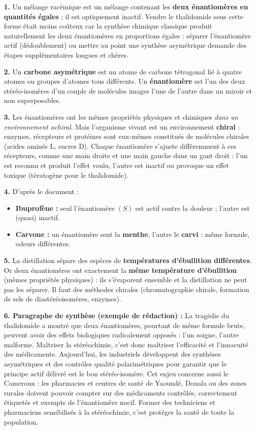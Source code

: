 \documentclass[11pt]{article}
\begin{document}
\begin{corrige}
\textbf{1.} Un mélange racémique est un mélange contenant les \textbf{deux énantiomères en quantités égales} ; il est optiquement inactif. Vendre le thalidomide sous cette forme était moins coûteux car la synthèse chimique classique produit naturellement les deux énantiomères en proportions égales : séparer l'énantiomère actif (dédoublement) ou mettre au point une synthèse asymétrique demande des étapes supplémentaires longues et chères.

\textbf{2.} Un \textbf{carbone asymétrique} est un atome de carbone tétragonal lié à quatre atomes ou groupes d'atomes tous différents. Un \textbf{énantiomère} est l'un des deux stéréo-isomères d'un couple de molécules images l'une de l'autre dans un miroir et non superposables.

\textbf{3.} Les énantiomères ont les mêmes propriétés physiques et chimiques \emph{dans un environnement achiral}. Mais l'organisme vivant est un environnement \textbf{chiral} : enzymes, récepteurs et protéines sont eux-mêmes constitués de molécules chirales (acides aminés L, sucres D). Chaque énantiomère s'ajuste différemment à ces récepteurs, comme une main droite et une main gauche dans un gant droit : l'un est reconnu et produit l'effet voulu, l'autre est inactif ou provoque un effet toxique (tératogène pour le thalidomide).

\textbf{4.} D'après le document :
\begin{itemize}
\item \textbf{Ibuprofène :} seul l'énantiomère $(S)$ est actif contre la douleur ; l'autre est (quasi) inactif.
\item \textbf{Carvone :} un énantiomère sent la \textbf{menthe}, l'autre le \textbf{carvi} : même formule, odeurs différentes.
\end{itemize}

\textbf{5.} La distillation sépare des espèces de \textbf{températures d'ébullition différentes}. Or deux énantiomères ont exactement la \textbf{même température d'ébullition} (mêmes propriétés physiques) : ils s'évaporent ensemble et la distillation ne peut pas les séparer. Il faut des méthodes chirales (chromatographie chirale, formation de sels de diastéréoisomères, enzymes).

\textbf{6. Paragraphe de synthèse (exemple de rédaction) :} La tragédie du thalidomide a montré que deux énantiomères, pourtant de même formule brute, peuvent avoir des effets biologiques radicalement opposés : l'un soigne, l'autre malforme. Maîtriser la stéréochimie, c'est donc maîtriser l'efficacité et l'innocuité des médicaments. Aujourd'hui, les industriels développent des synthèses asymétriques et des contrôles qualité polarimétriques pour garantir que le principe actif délivré est le bon stéréo-isomère. Cet enjeu concerne aussi le Cameroun : les pharmacies et centres de santé de Yaoundé, Douala ou des zones rurales doivent pouvoir compter sur des médicaments contrôlés, correctement étiquetés et exempts de l'énantiomère nocif. Former des techniciens et pharmaciens sensibilisés à la stéréochimie, c'est protéger la santé de toute la population.


\end{corrige}
\end{document}
